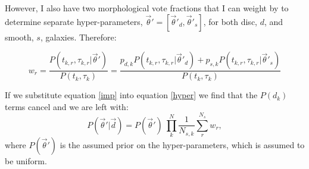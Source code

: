 However, I also have two morphological vote fractions that I can weight by to determine separate hyper-parameters, $\vec{\theta}' = [\vec{\theta}'_d, \vec{\theta}'_s]$, for both disc, $d$, and smooth, $s$, galaxies. Therefore:

\begin{equation}\label{morphimp}
w_r = \frac{P(t_{k,r}, \tau_{k,r}|\vec{\theta}')}{P(t_k, \tau_k)} =  \frac{p_{d,k} P(t_{k,r}, \tau_{k,r}|\vec{\theta}'_d) + p_{s,k} P(t_{k,r}, \tau_{k,r}|\vec{\theta}'_s)}{P(t_k, \tau_k)}
\end{equation} 

If we substitute equation \ref{imp} into equation \ref{hyper} we find that the $P(d_k)$ terms cancel and we are left with:
\begin{equation}
P(\vec{\theta}'|\vec{d}) = P(\vec{\theta}')~\prod_k^N \frac{1}{N_{s,k}} \sum_r^{N_s} w_r ,
\end{equation}
where $P(\vec{\theta}')$ is the assumed prior on the hyper-parameters, which is assumed to be uniform.

